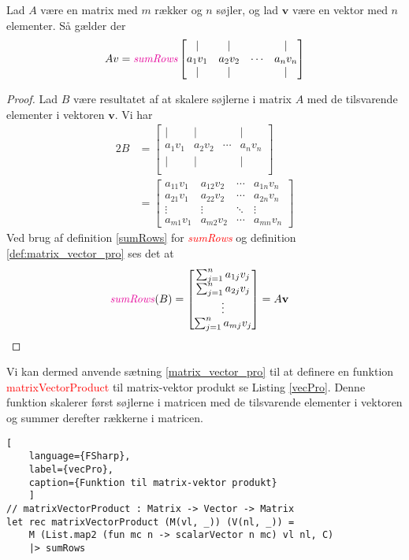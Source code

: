 \begin{theorem} \label{matrix_vector_pro}
    Lad $A$ være en matrix med $m$ rækker og $n$ søjler, og lad $\mathbf{v}$ være en vektor med $n$ elementer. Så gælder der
    \[ Av = \textit{\textcolor{red}{sumRows}}
    \begin{bmatrix}
        | & | &        & | \\
        a_{1}v_{1} & a_{2}v_{2} & \cdots & a_{n}v_{n} \\
        | & | &        & | \\
    \end{bmatrix}
    \]
\end{theorem}
\begin{proof}
    Lad $B$ være resultatet af at skalere søjlerne i matrix $A$ med de tilsvarende elementer i vektoren $\mathbf{v}$. Vi har
    \begin{alignat*}{2}
    B &= \begin{bmatrix}
        | & | &        & | \\
        a_{1}v_{1} & a_{2}v_{2} & \cdots & a_{n}v_{n} \\
        | & | &        & | \\
    \end{bmatrix} \\
    &= \begin{bmatrix}
        a_{11}v_{1} & a_{12}v_{2} & \cdots & a_{1n}v_{n} \\
        a_{21}v_{1} & a_{22}v_{2} & \cdots & a_{2n}v_{n} \\
        \vdots & \vdots & \ddots & \vdots \\
        a_{m1}v_{1} & a_{m2}v_{2} & \cdots & a_{mn}v_{n}
    \end{bmatrix}
    \end{alignat*}
    Ved brug af definition \ref{sumRows} for \textit{\textcolor{red}{sumRows}} og definition \ref{def:matrix_vector_pro} ses det at 
    \begin{alignat*}{2}
    \text{{\color{red}\textit{sumRows}}}(B) &= \begin{bmatrix}
        \sum_{j=1}^{n} a_{1j}v_{j} \\
        \sum_{j=1}^{n} a_{2j}v_{j} \\
        \vdots \\
        \sum_{j=1}^{n} a_{mj}v_{j}
    \end{bmatrix} = A\mathbf{v}
    \end{alignat*}
\end{proof}
Vi kan dermed anvende sætning \ref{matrix_vector_pro} til at definere en funktion \textcolor{red}{matrixVectorProduct} til matrix-vektor produkt se Listing \ref{vecPro}. Denne funktion skalerer først søjlerne i matricen med de tilsvarende elementer i vektoren og summer derefter rækkerne i matricen.
\begin{lstlisting}[
    language={FSharp}, 
    label={vecPro}, 
    caption={Funktion til matrix-vektor produkt}
    ]
// matrixVectorProduct : Matrix -> Vector -> Matrix
let rec matrixVectorProduct (M(vl, _)) (V(nl, _)) =
    M (List.map2 (fun mc n -> scalarVector n mc) vl nl, C) 
    |> sumRows
\end{lstlisting}

